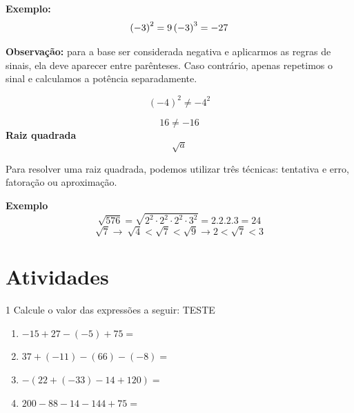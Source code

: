 \textbf{\hfill\break
Exemplo:} $$\left( - 3 \right)^{2} = 9\\
\left( - 3 \right)^{3} = -27\\$$

\textbf{Observação:} para a base ser considerada negativa e aplicarmos
as regras de sinais, ela deve aparecer entre parênteses. Caso contrário,
apenas repetimos o sinal e calculamos a potência separadamente.

$$\left( - 4 \right)^{2} \neq - 4^{2}$$

$$16 \neq - 16$$
\textbf{Raiz quadrada} 
$$\sqrt{a}$$


Para resolver uma raiz quadrada, podemos utilizar três técnicas:
tentativa e erro, fatoração ou aproximação.


\textbf{Exemplo}
$$\sqrt{576} = \sqrt{2^{2}\cdot2^{2}\cdot2^{2}\cdot3^2} = 2.2.2.3 = 24$$
$$\sqrt{7} \rightarrow \ \sqrt{4} < \sqrt{7} < \sqrt{9} \rightarrow 2 < \sqrt{7} < 3$$

\section{Atividades}

\num{1} Calcule o valor das expressões a seguir: TESTE

\begin{enumerate}

    \item $- 15 + 27 - (- 5) + 75 = $ 

    \item $37 + (- 11) - (66) - ( - 8) =$

    \item $- (22 + ( - 33 ) - 14 + 120) =$

    \item $200 - 88 - 14 - 144 + 75 =$

\end{enumerate}


